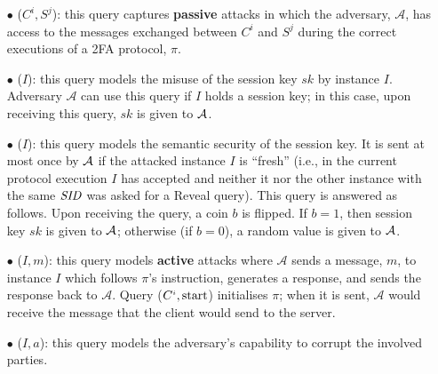 \begin{itemize}
%
\item [$\bullet$] \execute($C^{i}, S^{j}$): this query captures \textbf{passive} attacks in which the adversary, $\mathcal{A}$, has access to the messages exchanged between $C^{i}$ and $S^{j}$ during the correct executions of a 2FA protocol, $\pi$. 



\item [$\bullet$] \reveal($I$): this query models the misuse of the session key $sk$ by instance $I$.  Adversary $\mathcal{A}$ can use this query if $I$ holds a session key; in this case, upon receiving this query, $sk$ is given to $\mathcal{A}$. 
%



\item [$\bullet$] \test($I$): this query models the semantic security of the session key. It is sent at most once by $\mathcal{A}$ if the attacked instance $I$  is ``fresh'' (i.e., in the current protocol execution $I$ has accepted and neither it nor the other instance with the same $\mathit{SID}$ was asked for a Reveal query). This query is answered as follows. Upon receiving the query, a coin $b$ is flipped. If $b=1$, then session key $sk$ is given to $\mathcal{A}$; otherwise (if $b=0$), a random value is given to $\mathcal{A}$. 



\item [$\bullet$] \send($I, m$):  this query models \textbf{active} attacks where $\mathcal{A}$ sends a message, $m$, to instance $I$ which follows  $\pi$'s instruction, generates a response, and sends the response back to $\mathcal{A}$.  Query  \send($C^{\scriptscriptstyle i}, \text{start}$) initialises $\pi$; when it is sent, $\mathcal{A}$ would receive the message that the client would send to the server. 

%



%
\item [$\bullet$]  \corrupt($I, a$): this query models the adversary's capability to corrupt the involved parties. 




\end{itemize}
